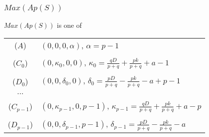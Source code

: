 \documentclass{beamer}
\begin{document}
\begin{frame}[noframenumbering]
\begin{center}
\frametitle{$Max(Ap(S))$}

$Max(Ap(S))$ is one of \\

{\footnotesize
\begin{center}
\begin{tabular}{cl}
($A$) & $\left(0, 0, 0, \alpha\right)$, $\alpha = p - 1$\\
 &\\
($C_0$) & $\left(0, \kappa _ 0, 0, 0\right)$, $\kappa _ 0 = \frac{q D}{p + q} + \frac{p k}{p + q} + a - 1$\\
 &\\
($D_0$) & $\left(0, 0, \delta _ 0, 0\right)$, $\delta _ 0 = \frac{p D}{p + q} - \frac{p k}{p + q} - a + p - 1$\\
 &\\
$\dots$ &\\
 &\\
($C_{p - 1}$) & $\left(0, \kappa _ {p - 1}, 0, p - 1\right)$, $\kappa _ {p - 1} = \frac{q D}{p + q} + \frac{p k}{p + q} + a - p$\\
 &\\
($D_{p - 1}$) & $\left(0, 0, \delta _ {p - 1}, p - 1\right)$, $\delta _ {p - 1} = \frac{p D}{p + q} - \frac{p k}{p + q} - a$\\
\end{tabular}
\end{center}
}

\end{center}
\end{frame}

\end{document}
